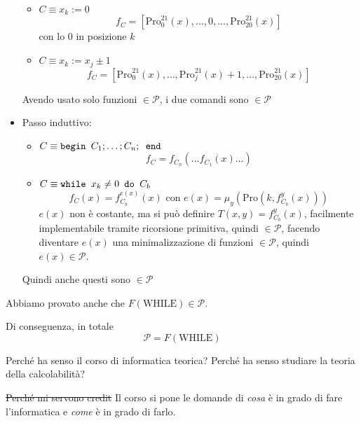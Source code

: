 \documentclass[12pt, answers]{exam}
\theoremstyle{plain}
\newcommand{\while}{\text{WHILE}}
\newcommand{\cp}{\mathcal{P}}
\newcommand{\pro}{\text{Pro}}
\begin{document}
\begin{questions}
\begin{solution}
\begin{itemize}
                \begin{itemize}
                    \item $C \equiv x_k :=0$
                    $$ f_C = \left[ \pro^{21}_0 (x), \dots, 0, \dots, \pro^{21}_20 (x) \right] $$
                    con lo 0 in posizione $k$
                    
                    \item $C \equiv x_k := x_j \pm 1$
                    $$ f_C = \left[\pro^{21}_0 (x), \dots, \pro^{21}_j (x) + 1, \dots, \pro^{21}_20 (x) \right] $$
                \end{itemize}
                Avendo usato solo funzioni $\in \cp$, i due comandi sono $\in \cp$
                
                \item Passo induttivo: 
                \begin{itemize}
                    \item $C \equiv \text{\texttt{begin }} C_1; \dots; C_n; \text{\texttt{ end}}$
                    $$ f_C = f_{C_n} ( \dots f_{C_1}(x) \dots )$$
                    
                    \item $C \equiv \text{\texttt{while }} x_k \neq 0 \text{\texttt{ do }} C_b$
                    $$ f_C (x) = f_{C_b}^{e(x)} (x) \text{ con } e(x) = \mu_y (\pro(k, f_{C_b}^y (x))) $$
                    $e(x)$ non è costante, ma si può definire $T(x,y) = f_{C_b}^y (x)$, facilmente implementabile tramite ricorsione primitiva, quindi $\in \cp$, facendo diventare $e(x)$ una minimalizzazione di funzioni $\in \cp$, quindi $e(x) \in \cp$. 
                \end{itemize}
                Quindi anche questi sono $\in \cp$
            \end{itemize}
            Abbiamo provato anche che $F(\while) \in \cp$.
            
            Di conseguenza, in totale
            $$ \cp = F(\while) $$ 
        \end{solution}
        
        \question Perché ha senso il corso di informatica teorica? Perché ha senso studiare la teoria della calcolabilità?
        
        \begin{solution}
            \sout{Perché mi servono credit} Il corso si pone le domande di \textit{cosa} è in grado di fare l'informatica e \textit{come} è in grado di farlo.
            

\end{solution}
\end{questions}
\end{document}
